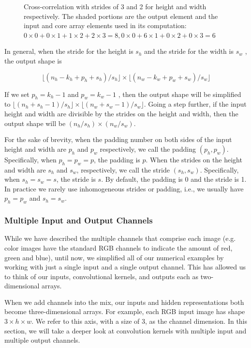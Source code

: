 \begin{figure}[hpt]
	\centering
	
	\caption{Cross-correlation with strides of 3 and 2 for height and width respectively. The shaded portions are the output element and the input and core array elements used in its computation: $0\times0+0\times1+1\times2+2\times3=8,  0\times0+6\times1+0\times2+0\times3=6$}
	\label{fig:conv_stride}
\end{figure}

In general, when the stride for the height is $s_h$  and the stride for the width is $s_w$ , the output shape is

$$\lfloor(n_h-k_h+p_h+s_h)/s_h\rfloor \times \lfloor(n_w-k_w+p_w+s_w)/s_w\rfloor$$
 
If we set $p_h=k_h-1$  and  $p_w=k_w-1$ , then the output shape will be simplified to $\lfloor(n_h+s_h-1)/s_h\rfloor \times \lfloor(n_w+s_w-1)/s_w\rfloor$. Going a step further, if the input height and width are divisible by the strides on the height and width, then the output shape will be $(n_h/s_h)\times(n_w/s_w)$.

For the sake of brevity, when the padding number on both sides of the input height and width are $p_h$  and $p_w$  respectively, we call the padding $(p_h,p_w)$. Specifically, when  $p_h=p_w=p$, the padding is $p$. When the strides on the height and width are $s_h$ and $s_w$, respectively, we call the stride $(s_h,s_w)$. Specifically, when $s_h=s_w=s$, the stride is $s$. By default, the padding is 0 and the stride is 1. In practice we rarely use inhomogeneous strides or padding, i.e., we usually have $p_h=p_w$ and $s_h=s_w$.

\subsubsection{Multiple Input and Output Channels}

While we have described the multiple channels that comprise each image (e.g. color images have the standard RGB channels to indicate the amount of red, green and blue), until now, we simplified all of our numerical examples by working with just a single input and a single output channel. This has allowed us to think of our inputs, convolutional kernels, and outputs each as two-dimensional arrays.

When we add channels into the mix, our inputs and hidden representations both become three-dimensional arrays. For example, each RGB input image has shape $3\times h\times w$. We refer to this axis, with a size of 3, as the channel dimension. In this section, we will take a deeper look at convolution kernels with multiple input and multiple output channels.

